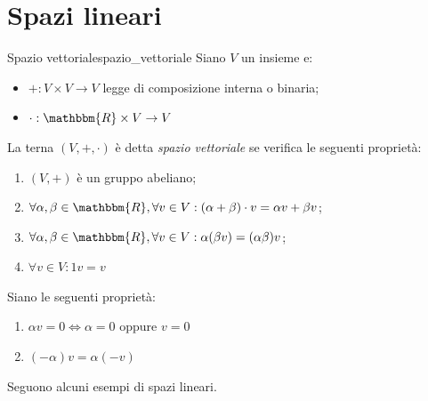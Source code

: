\documentclass[12pt]{report}
\newcounter{definition}
\newcommand{\nmu}{}
\begin{document}
\chapter{Spazi lineari}
\begin{definition}{\nmu Spazio vettoriale}{spazio_vettoriale}
	Siano $V$ un insieme e:
	\begin{itemize}
		\item $+: V \times V \to V$ legge di composizione interna o binaria;
		\item $\cdot: \mathbbm{R} \times V \to V$ 
	\end{itemize}
	La terna $(V, +, \cdot)$ è detta \textit{spazio vettoriale}  se verifica le seguenti proprietà:
	\begin{enumerate}
		\item $(V, +)$ è un gruppo abeliano;
		\item $\forall \alpha, \beta \in \mathbbm{R}, \forall v \in V: (\alpha + \beta) \cdot v = \alpha v + \beta v$;
		\item $\forall \alpha, \beta \in \mathbbm{R}, \forall v \in V: \alpha(\beta v) = (\alpha\beta)v$;
		\item $\forall v \in V: 1v = v$
	\end{enumerate}
\end{definition}
Siano le seguenti proprietà:
\begin{enumerate}
	\item $\alpha v = 0 \iff \alpha = 0$ oppure $v = 0$
	\item $(-\alpha) v = \alpha(-v)$
\end{enumerate}
Seguono alcuni esempi di spazi lineari.
\end{document}
